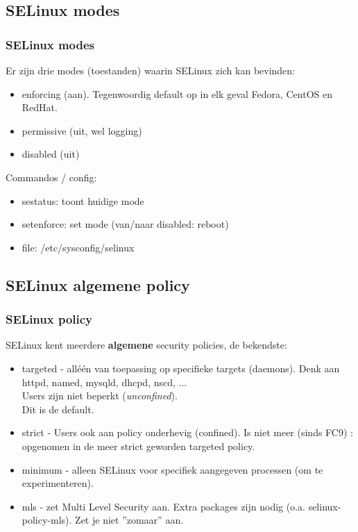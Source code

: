 \subsection{SELinux modes}
\begin{styleframe}
    \frametitle{SELinux modes}
Er zijn drie modes (toestanden) waarin SELinux zich kan bevinden:
\begin{itemize}
	\pause
	\item enforcing (aan). Tegenwoordig default op in elk geval Fedora, CentOS en RedHat.
	\pause
	\item permissive (uit, wel logging)
	\pause
	\item disabled (uit)
\end{itemize}
Commandos / config:
\begin{itemize}
	\pause
	\item sestatus: toont huidige mode
	\pause
	\item setenforce: set mode (van/naar disabled: reboot)
	\pause
	\item file: /etc/sysconfig/selinux
\end{itemize}
\end{styleframe}

\subsection{SELinux {\bf algemene} policy}
\begin{styleframe}
	\frametitle{SELinux policy}
\pause
SELinux kent meerdere {\bf algemene} security policies, de bekendste:
\begin{itemize}
	\pause
 	\item targeted - all\'e\'en van toepassing op specifieke targets (daemons). Denk aan httpd, named, mysqld, dhcpd, nscd, ... \\
Users zijn niet beperkt ({\it unconfined}). \\
Dit is de default.
	\pause
	\item strict - Users ook aan policy onderhevig (confined). Is niet meer (sinds FC9) : opgenomen in de meer strict geworden targeted policy.
	\pause
	\item minimum - alleen SELinux voor specifiek aangegeven processen (om te experimenteren).
	\pause
	\item mls - zet Multi Level Security aan. Extra packages zijn nodig (o.a. selinux-policy-mls). Zet je niet ''zomaar'' aan.
\end{itemize}
\end{styleframe}


